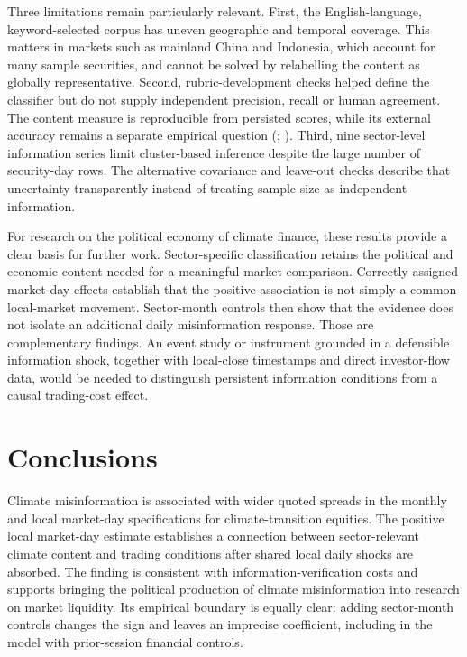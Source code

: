 \documentclass{article}
\theoremstyle{plain}
\begin{document}
Three limitations remain particularly relevant. First, the English-language, keyword-selected corpus has uneven geographic and temporal coverage. This matters in markets such as mainland China and Indonesia, which account for many sample securities, and cannot be solved by relabelling the content as globally representative. Second, rubric-development checks helped define the classifier but do not supply independent precision, recall or human agreement. The content measure is reproducible from persisted scores, while its external accuracy remains a separate empirical question (\cite{grimmer2022text}; \cite{gilardi2023chatgpt}). Third, nine sector-level information series limit cluster-based inference despite the large number of security-day rows. The alternative covariance and leave-out checks describe that uncertainty transparently instead of treating sample size as independent information.

For research on the political economy of climate finance, these results provide a clear basis for further work. Sector-specific classification retains the political and economic content needed for a meaningful market comparison. Correctly assigned market-day effects establish that the positive association is not simply a common local-market movement. Sector-month controls then show that the evidence does not isolate an additional daily misinformation response. Those are complementary findings. An event study or instrument grounded in a defensible information shock, together with local-close timestamps and direct investor-flow data, would be needed to distinguish persistent information conditions from a causal trading-cost effect.

\section{Conclusions}
\label{sec:conclusion}

Climate misinformation is associated with wider quoted spreads in the monthly and local market-day specifications for climate-transition equities. The positive local market-day estimate establishes a connection between sector-relevant climate content and trading conditions after shared local daily shocks are absorbed. The finding is consistent with information-verification costs and supports bringing the political production of climate misinformation into research on market liquidity. Its empirical boundary is equally clear: adding sector-month controls changes the sign and leaves an imprecise coefficient, including in the model with prior-session financial controls.
\end{document}
